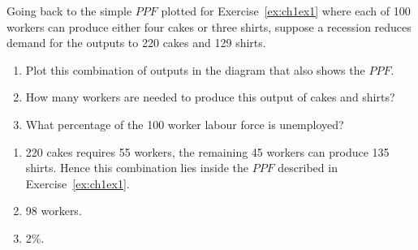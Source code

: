 \begin{enumialphparenastyle}
\begin{ex}\label{ex:ch1ex9}
Going back to the simple $PPF$ plotted for Exercise~\ref{ex:ch1ex1} where each of 100 workers can produce either four cakes or three shirts, suppose a recession reduces demand for the outputs to 220 cakes and 129 shirts.
\begin{enumerate}
	\item	Plot this combination of outputs in the diagram that also shows the $PPF$.
	\item	How many workers are needed to produce this output of cakes and shirts?
	\item	What percentage of the 100 worker labour force is unemployed?
\end{enumerate}
\begin{sol}
\begin{enumerate}
	\item	220 cakes requires 55 workers, the remaining 45 workers can produce 135 shirts. Hence this combination lies inside the $PPF$ described in Exercise~\ref{ex:ch1ex1}.
	\item	98 workers.
	\item	2\%.
\end{enumerate}
\end{sol}
\end{ex}


\end{enumialphparenastyle}